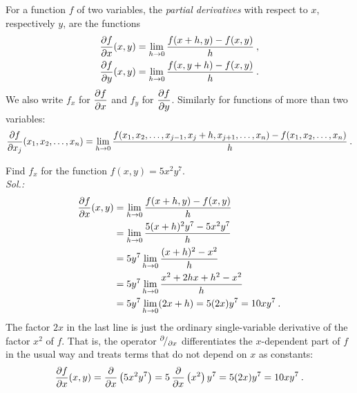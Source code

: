 \begin{definition}
For a function $f$ of two variables, the \emph{partial derivatives} with respect to $x$, respectively $y$, are the functions 	
\begin{equation*}
\begin{split}
\displaystyle{\frac{\partial f}{\partial x}}(x,y) & = \lim_{h\to 0} \frac{f(x+h,y)-f(x,y)}{h} \:, \\
\displaystyle{\frac{\partial f}{\partial y}}(x,y) & = \lim_{h\to 0} \frac{f(x,y+h)-f(x,y)}{h} \:.
\end{split}
\end{equation*}
We also write $f_x$ for $\displaystyle{\frac{\partial f}{\partial x}}$ and $f_y$ for $\displaystyle{\frac{\partial f}{\partial y}}$. Similarly for functions of more than two variables:
\begin{equation*}
\displaystyle{\frac{\partial f}{\partial x_j}}(x_1,x_2,\dots,x_n) = \lim_{h\to 0}
\frac{f(x_1,x_2,\dots,x_{j-1},x_j+h,x_{j+1},\dots,x_n)-f(x_1,x_2,\dots,x_n)}{h} \:. \\
\end{equation*}
\end{definition}

\begin{example}
Find $f_x$ for the function $f(x,y) = 5x^2y^7$.\\
{\it Sol.:}
\begin{equation*}
\begin{split}
\displaystyle{\frac{\partial f}{\partial x}}(x,y) & = \lim_{h\to 0}  \frac{f(x+h,y)-f(x,y)}{h} \\
& = \lim_{h\to 0}  \frac{5(x+h)^2y^7-5x^2y^7}{h} \\
& = 5y^7 \lim_{h\to 0} \frac{(x+h)^2 - x^2}{h} \\
& = 5y^7 \lim_{h\to 0} \frac{x^2+2hx+h^2 - x^2}{h} \\
& = 5y^7 \lim_{h\to 0} (2x+h) = 5(2x)y^7 = 10xy^7 \:.
\end{split}
\end{equation*}
The factor $2x$ in the last line is just the ordinary single-variable derivative of the factor $x^2$ of $f$. That is, the operator ${}^{\partial}\!/_{\partial x}$ differentiates the $x$-dependent part of $f$ in the usual way and treats terms that do not depend on $x$ as constants:
\begin{equation*}
\displaystyle{\frac{\partial f}{\partial x}}(x,y) = \displaystyle{\frac{\partial }{\partial x}} \left( 5x^2y^7\right) = 5 \, \displaystyle{\frac{\partial }{\partial x}} \left( x^2\right) y^7 = 5(2x)y^7 = 10xy^7 \:.
\end{equation*}
\end{example}

